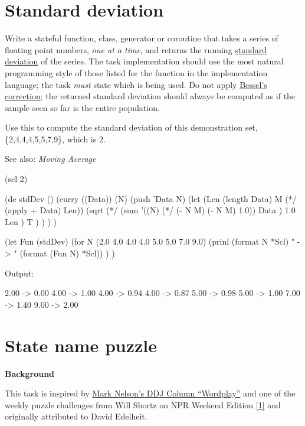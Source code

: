 \begin{itemize}
\pagebreak{}
\section*{Standard deviation}

Write a stateful function, class, generator or coroutine that takes a
series of floating point numbers, \emph{one at a time}, and returns the
running \href{http://en.wikipedia.org/wiki/Standard\_Deviation}{standard
deviation} of the series. The task implementation should use the most
natural programming style of those listed for the function in the
implementation language; the task \emph{must} state which is being used.
Do not apply
\href{http://en.wikipedia.org/wiki/Bessel\%27s\_correction}{Bessel's
correction}; the returned standard deviation should always be computed
as if the sample seen so far is the entire population.

Use this to compute the standard deviation of this demonstration set,
\{2,4,4,4,5,5,7,9\}, which is 2.

See also: \emph{Moving Average}


\begin{wideverbatim}

(scl 2)

(de stdDev ()
   (curry ((Data)) (N)
      (push 'Data N)
      (let (Len (length Data)  M (*/ (apply + Data) Len))
         (sqrt
            (*/
               (sum
                  '((N) (*/ (- N M) (- N M) 1.0))
                  Data )
               1.0
               Len )
            T ) ) ) )

(let Fun (stdDev)
   (for N (2.0 4.0 4.0 4.0 5.0 5.0 7.0 9.0)
      (prinl (format N *Scl) " -> " (format (Fun N) *Scl)) ) )

Output:

2.00 -> 0.00
4.00 -> 1.00
4.00 -> 0.94
4.00 -> 0.87
5.00 -> 0.98
5.00 -> 1.00
7.00 -> 1.40
9.00 -> 2.00

\end{wideverbatim}

\pagebreak{}
\section*{State name puzzle}

\textbf{Background}

This task is inspired by
\href{http://drdobbs.com/windows/198701685}{Mark Nelson's DDJ Column
  ``Wordplay''} and one of the weekly puzzle challenges from Will
Shortz on NPR Weekend Edition
\href{http://www.npr.org/templates/story/story.php?storyId=9264290}{{[}1{]}}
and originally attributed to David Edelheit.


\end{itemize}
